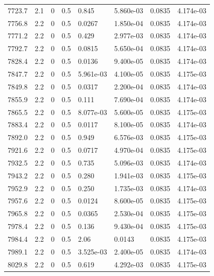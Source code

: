 \documentclass[preview]{standalone}
\begin{document}
{{{{{{{{\begin{tabular}{L{1.2cm}C{1.2cm} C{0.3cm}C{0.5cm} C{1.4cm}C{1.4cm} C{1.4cm}C{1.4cm}}
  7723.7  &   2.1  & 0     & 0.5 &  0.845  & 5.860e-03  & 0.0835 &  4.174e-03   \\ 
  7756.8  &   2.2  & 0     & 0.5 &  0.0267  & 1.850e-04  & 0.0835 &  4.174e-03   \\ 
  7771.2  &   2.2  & 0     & 0.5 &  0.429  & 2.977e-03  & 0.0835 &  4.174e-03   \\ 
  7792.7  &   2.2  & 0     & 0.5 &  0.0815  & 5.650e-04  & 0.0835 &  4.174e-03   \\ 
  7828.4  &   2.2  & 0     & 0.5 &  0.0136  & 9.400e-05  & 0.0835 &  4.174e-03   \\ 
  7847.7  &   2.2  & 0     & 0.5 &  5.961e-03  & 4.100e-05  & 0.0835 &  4.175e-03   \\ 
  7849.8  &   2.2  & 0     & 0.5 &  0.0317  & 2.200e-04  & 0.0835 &  4.174e-03   \\ 
  7855.9  &   2.2  & 0     & 0.5 &  0.111  & 7.690e-04  & 0.0835 &  4.174e-03   \\ 
  7865.5  &   2.2  & 0     & 0.5 &  8.077e-03  & 5.600e-05  & 0.0835 &  4.175e-03   \\ 
  7883.4  &   2.2  & 0     & 0.5 &  0.0117  & 8.100e-05  & 0.0835 &  4.174e-03   \\ 
  7892.0  &   2.2  & 0     & 0.5 &  0.949  & 6.576e-03  & 0.0835 &  4.175e-03   \\ 
  7921.6  &   2.2  & 0     & 0.5 &  0.0717  & 4.970e-04  & 0.0835 &  4.175e-03   \\ 
  7932.5  &   2.2  & 0     & 0.5 &  0.735  & 5.096e-03  & 0.0835 &  4.174e-03   \\ 
  7943.2  &   2.2  & 0     & 0.5 &  0.280  & 1.941e-03  & 0.0835 &  4.175e-03   \\ 
  7952.9  &   2.2  & 0     & 0.5 &  0.250  & 1.735e-03  & 0.0835 &  4.174e-03   \\ 
  7957.6  &   2.2  & 0     & 0.5 &  0.0124  & 8.600e-05  & 0.0835 &  4.175e-03   \\ 
  7965.8  &   2.2  & 0     & 0.5 &  0.0365  & 2.530e-04  & 0.0835 &  4.175e-03   \\ 
  7978.4  &   2.2  & 0     & 0.5 &  0.136  & 9.430e-04  & 0.0835 &  4.175e-03   \\ 
  7984.4  &   2.2  & 0     & 0.5 &  2.06  & 0.0143  & 0.0835 &  4.175e-03   \\ 
  7989.1  &   2.2  & 0     & 0.5 &  3.525e-03  & 2.400e-05  & 0.0835 &  4.174e-03   \\ 
  8029.8  &   2.2  & 0     & 0.5 &  0.619  & 4.292e-03  & 0.0835 &  4.175e-03   \\ 

\end{tabular}}}}}}}}}
\end{document}
